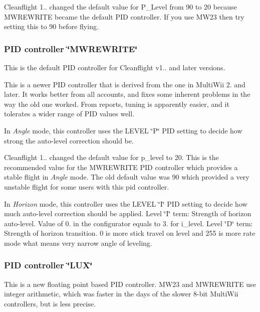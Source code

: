Cleanflight 1.. changed the default value for {\ttfamily P\+\_\+\+Level} from 90 to 20 because M\+W\+R\+E\+W\+R\+I\+T\+E became the default P\+I\+D controller. If you use M\+W23 then try setting this to 90 before flying.

\subsubsection*{P\+I\+D controller \char`\"{}\+M\+W\+R\+E\+W\+R\+I\+T\+E\char`\"{}}

This is the default P\+I\+D controller for Cleanflight v1.. and later versions.

This is a newer P\+I\+D controller that is derived from the one in Multi\+Wii 2. and later. It works better from all accounts, and fixes some inherent problems in the way the old one worked. From reports, tuning is apparently easier, and it tolerates a wider range of P\+I\+D values well.

In {\itshape Angle} mode, this controller uses the L\+E\+V\+E\+L \char`\"{}\+P\char`\"{} P\+I\+D setting to decide how strong the auto-\/level correction should be.

Cleanflight 1.. changed the default value for {\ttfamily p\+\_\+level} to 20. This is the recommended value for the M\+W\+R\+E\+W\+R\+I\+T\+E P\+I\+D controller which provides a stable flight in {\itshape Angle} mode. The old default value was 90 which provided a very unstable flight for some users with this pid controller.

In {\itshape Horizon} mode, this controller uses the L\+E\+V\+E\+L \char`\"{}\+I\char`\"{} P\+I\+D setting to decide how much auto-\/level correction should be applied. Level \char`\"{}\+I\char`\"{} term\+: Strength of horizon auto-\/level. Value of 0. in the configurator equals to 3. for {\ttfamily i\+\_\+level}. Level \char`\"{}\+D\char`\"{} term\+: Strength of horizon transition. 0 is more stick travel on level and 255 is more rate mode what means very narrow angle of leveling.

\subsubsection*{P\+I\+D controller \char`\"{}\+L\+U\+X\char`\"{}}

This is a new floating point based P\+I\+D controller. M\+W23 and M\+W\+R\+E\+W\+R\+I\+T\+E use integer arithmetic, which was faster in the days of the slower 8-\/bit Multi\+Wii controllers, but is less precise.

